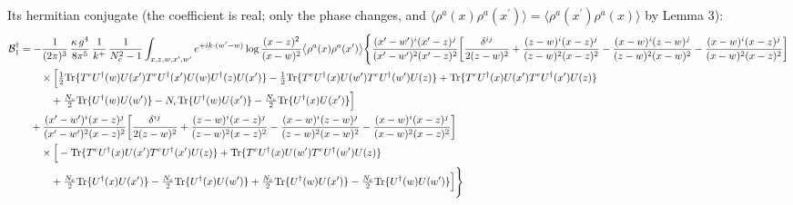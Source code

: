 \documentclass[10pt]{article}
\begin{document}
\noindent Its hermitian conjugate (the coefficient is real; only the phase changes, and $\langle\rho^{a}(x)\rho^{a}(x^{\prime})\rangle=\langle\rho^{a}(x^{\prime})\rho^{a}(x)\rangle$ by Lemma 3):
\begin{align}
\mathcal{B}_{1}^{\dagger}&=-\frac{1}{(2\pi)^{3}}\,\frac{\kappa\,g^{4}}{8\pi^{5}}\,\frac{1}{k^{+}}\,\frac{1}{N_{c}^{2}-1}\int_{x,z,w,x',w'}e^{+ik\cdot(w'-w)}\log\frac{(x-z)^{2}}{(x-w)^{2}}\big\langle\rho^{a}(x)\rho^{a}(x')\big\rangle\Bigg\{\frac{(x'-w')^{i}(x'-z)^{j}}{(x'-w')^{2}(x'-z)^{2}}\bigg[\frac{\delta^{ij}}{2(z-w)^{2}}+\frac{(z-w)^{i}(x-z)^{j}}{(z-w)^{2}(x-z)^{2}}-\frac{(x-w)^{i}(z-w)^{j}}{(z-w)^{2}(x-w)^{2}}-\frac{(x-w)^{i}(x-z)^{j}}{(x-w)^{2}(x-z)^{2}}\bigg]\notag\\
&\qquad\times\Big[\tfrac12{\rm Tr}\{T^{e}U^{\dagger}(w)U(x')T^{e}U^{\dagger}(x')U(w)U^{\dagger}(z)U(x')\}-\tfrac12{\rm Tr}\{T^{e}U^{\dagger}(x)U(w')T^{e}U^{\dagger}(w')U(z)\}+{\rm Tr}\{T^{e}U^{\dagger}(x)U(x')T^{e}U^{\dagger}(x')U(z)\}\notag\\
&\qquad\quad+\tfrac{N_{c}}{2}{\rm Tr}\{U^{\dagger}(w)U(w')\}-N_{c}{\rm Tr}\{U^{\dagger}(w)U(x')\}-\tfrac{N_{c}}{2}{\rm Tr}\{U^{\dagger}(x)U(x')\}\Big]\notag\\
&\quad+\frac{(x'-w')^{i}(x-z)^{j}}{(x'-w')^{2}(x-z)^{2}}\bigg[\frac{\delta^{ij}}{2(z-w)^{2}}+\frac{(z-w)^{i}(x-z)^{j}}{(z-w)^{2}(x-z)^{2}}-\frac{(x-w)^{i}(z-w)^{j}}{(z-w)^{2}(x-w)^{2}}-\frac{(x-w)^{i}(x-z)^{j}}{(x-w)^{2}(x-z)^{2}}\bigg]\notag\\
&\qquad\times\Big[-{\rm Tr}\{T^{e}U^{\dagger}(x)U(x')T^{e}U^{\dagger}(x')U(z)\}+{\rm Tr}\{T^{e}U^{\dagger}(x)U(w')T^{e}U^{\dagger}(w')U(z)\}\notag\\
&\qquad\quad+\tfrac{N_{c}}{2}{\rm Tr}\{U^{\dagger}(x)U(x')\}-\tfrac{N_{c}}{2}{\rm Tr}\{U^{\dagger}(x)U(w')\}+\tfrac{N_{c}}{2}{\rm Tr}\{U^{\dagger}(w)U(x')\}-\tfrac{N_{c}}{2}{\rm Tr}\{U^{\dagger}(w)U(w')\}\Big]\Bigg\}\notag\\[6pt]
\end{align}
\end{document}
